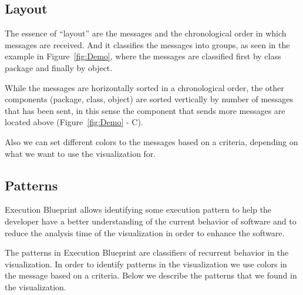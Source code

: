 \documentclass{sig-alternate}
\newcommand{\largefig}[4]{
	\begin{figure*}[#1]
		\centering
		\texttt{[image: \#3]}
		\caption{\label{fig:#3}#4}
	\end{figure*}}
\newcommand{\figref}[1]{Figure~\ref{fig:#1}}
\begin{document}
\subsection{Layout}


The essence of ``layout'' are the messages and the chronological order in which messages are received. And it classifies the messages into groups, as seen in the example in \figref{Demo}, where the messages are classified first by class package and finally by object.

While the messages are horizontally sorted in a chronological order, the other components (package, class, object) are sorted vertically by number of messages that has been sent, in this sense the component that sends more messages are located above (\figref{Demo} - C).

Also we can set different colors to the messages based on a criteria, depending on what we want to use the visualization for.


\subsection{Patterns}

Execution Blueprint allows identifying some execution pattern to help the developer have a better understanding of the current behavior of software and to reduce the analysis time of the visualization in order to enhance the software.

The patterns in Execution Blueprint are classifiers of  recurrent behavior in the visualization. In order to identify patterns in the visualization we use colors in the message based on a criteria. Below we describe the patterns that we found in the visualization.
\end{document}

